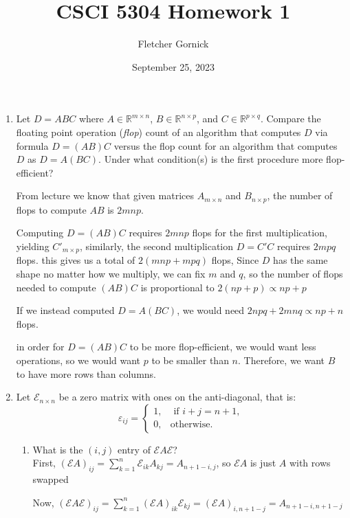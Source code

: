 \documentclass[11pt]{article}
\title{\vspace{-1.0cm}CSCI 5304 Homework 1}
\author{Fletcher Gornick}
\date{September 25, 2023}
\newcommand{\R}{\mathbb{R}}
\newcommand{\Eps}{\mathcal{E}}
\newcommand{\n}{\vspace{0.2cm}}
\begin{document}
\maketitle
\begin{enumerate}
	\item Let \(D = ABC\) where \(A \in \R^{m \times n}\), \(B \in \R^{n \times p}\), and \(C \in \R^{p \times q}\).  Compare the floating point operation (\textit{flop}) count of an algorithm that computes \(D\) via formula \(D = (AB)C\) versus the flop count for an algorithm that computes \(D\) as \(D = A(BC)\).  Under what condition(s) is the first procedure more flop-efficient?

	      From lecture we know that given matrices \(A_{m \times n}\) and \(B_{n \times p}\), the number of flops to compute \(AB\) is \(2mnp\).

	      Computing \(D = (AB)C\) requires \(2mnp\) flops for the first multiplication, yielding \(C'_{m \times p}\), similarly, the second multiplication \(D = C'C\) requires \(2mpq\) flops.  this gives us a total of \(2(mnp + mpq)\) flops, Since \(D\) has the same shape no matter how we multiply, we can fix \(m\) and \(q\), so the number of flops needed to compute \((AB)C\) is proportional to \(2(np + p) \propto np + p\)

	      If we instead computed \(D = A(BC)\), we would need \(2npq + 2mnq \propto np + n\) flops.

	      in order for \(D = (AB)C\) to be more flop-efficient, we would want less operations, so we would want \(p\) to be smaller than \(n\).  Therefore, we want \(B\) to have more rows than columns.


	\item Let \(\Eps_{n \times n}\) be a zero matrix with ones on the anti-diagonal, that is:
	      \[\varepsilon_{ij} = \begin{cases} 1, &\text{ if } i+j = n+1, \\ 0, &\text{otherwise.} \end{cases}\]
	      \begin{enumerate}[label=(\alph*)]
		      \item What is the \((i,j)\) entry of \(\Eps A \Eps\)? \n\\
		            First, \((\Eps A)_{ij} = \displaystyle\sum_{k=1}^n \Eps_{ik} A_{kj} = A_{n+1-i,j}\), so \(\Eps A\) is just \(A\) with rows swapped

		            Now, \((\Eps A \Eps)_{ij} = \displaystyle\sum_{k=1}^n (\Eps A)_{ik} \Eps_{kj} = (\Eps A)_{i, n+1-j} = A_{n+1-i, n+1-j}\)


\end{enumerate}
\end{enumerate}
\end{document}
